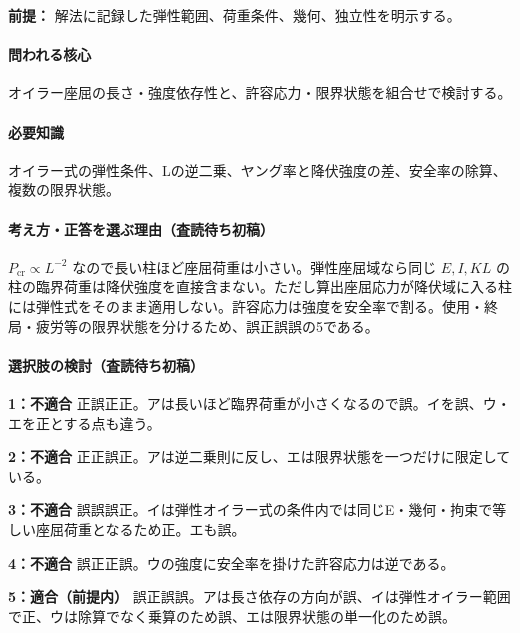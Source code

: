 \noindent\textbf{前提：} 解法に記録した弾性範囲、荷重条件、幾何、独立性を明示する。\par

\paragraph{問われる核心} オイラー座屈の長さ・強度依存性と、許容応力・限界状態を組合せで検討する。

\paragraph{必要知識} オイラー式の弾性条件、Lの逆二乗、ヤング率と降伏強度の差、安全率の除算、複数の限界状態。

\paragraph{考え方・正答を選ぶ理由（査読待ち初稿）} \(P_{\mathrm{cr}}\propto L^{-2}\) なので長い柱ほど座屈荷重は小さい。弾性座屈域なら同じ \(E,I,KL\) の柱の臨界荷重は降伏強度を直接含まない。ただし算出座屈応力が降伏域に入る柱には弾性式をそのまま適用しない。許容応力は強度を安全率で割る。使用・終局・疲労等の限界状態を分けるため、誤正誤誤の5である。

\paragraph{選択肢の検討（査読待ち初稿）}\mbox{}\par

\noindent\textbf{1：不適合} 正誤正正。アは長いほど臨界荷重が小さくなるので誤。イを誤、ウ・エを正とする点も違う。\par

\noindent\textbf{2：不適合} 正正誤正。アは逆二乗則に反し、エは限界状態を一つだけに限定している。\par

\noindent\textbf{3：不適合} 誤誤誤正。イは弾性オイラー式の条件内では同じE・幾何・拘束で等しい座屈荷重となるため正。エも誤。\par

\noindent\textbf{4：不適合} 誤正正誤。ウの強度に安全率を掛けた許容応力は逆である。\par

\noindent\textbf{5：適合（前提内）} 誤正誤誤。アは長さ依存の方向が誤、イは弾性オイラー範囲で正、ウは除算でなく乗算のため誤、エは限界状態の単一化のため誤。\par

